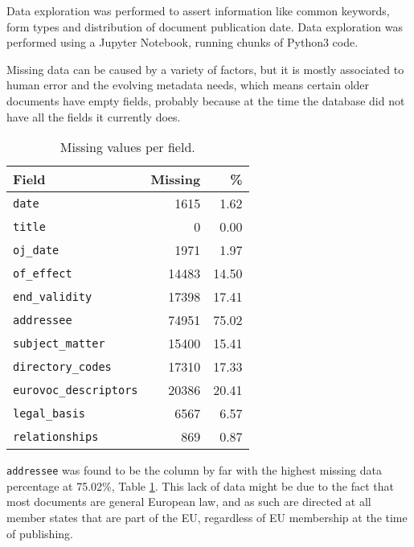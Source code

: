 \documentclass[sigconf, authorversion]{acmart}
\begin{document}
Data exploration was performed to assert information like common keywords, form types and distribution of document publication date. Data exploration was performed using a Jupyter Notebook, running chunks of Python3 code.

Missing data can be caused by a variety of factors, but it is mostly associated to human error and the evolving metadata needs, which means certain older documents have empty fields, probably because at the time the database did not have all the fields it currently does.

\begin{table}[h]
    \centering
    \caption{Missing values per field.} \label{tab:missing}
    \begin{tabular}{@{}l|r|r@{}}
        \textbf{Field}              & \textbf{Missing}& \textbf{\%} \\ \hline
        \texttt{date}                   & 1615            & 1.62                    \\
        \texttt{title}                  & 0               & 0.00                    \\
        \texttt{oj\_date}               & 1971            & 1.97                    \\
        \texttt{of\_effect}             & 14483           & 14.50                   \\
        \texttt{end\_validity}          & 17398           & 17.41                   \\
        \texttt{addressee}              & 74951           & 75.02                   \\
        \texttt{subject\_matter}        & 15400           & 15.41                   \\
        \texttt{directory\_codes}       & 17310           & 17.33                   \\
        \texttt{eurovoc\_descriptors}   & 20386           & 20.41                   \\
        \texttt{legal\_basis}           & 6567            & 6.57                    \\
        \texttt{relationships}          & 869             & 0.87                    \\
    \end{tabular}
\end{table}

\texttt{addressee} was found to be the column by far with the highest missing data percentage at 75.02\%, Table \ref{tab:missing}. This lack of data might be due to the fact that most documents are general European law, and as such are directed at all member states that are part of the EU, regardless of EU membership at the time of publishing.
\end{document}
